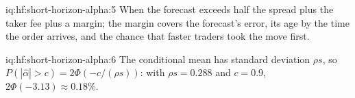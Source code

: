 \begin{solution}{iq:hf:short-horizon-alpha:5}
When the forecast exceeds half the spread plus the taker fee plus a margin; the margin covers the forecast's error, its age by the time the order
arrives, and the chance that faster traders took the move first.
\end{solution}

\begin{solution}{iq:hf:short-horizon-alpha:6}
The conditional mean has standard deviation $\rho s$, so $P(|\hat\alpha|>c)=2\Phi(-c/(\rho s))$: with $\rho s=0.288$ and $c=0.9$, $2\Phi(-3.13)
\approx0.18\%$.
\end{solution}
